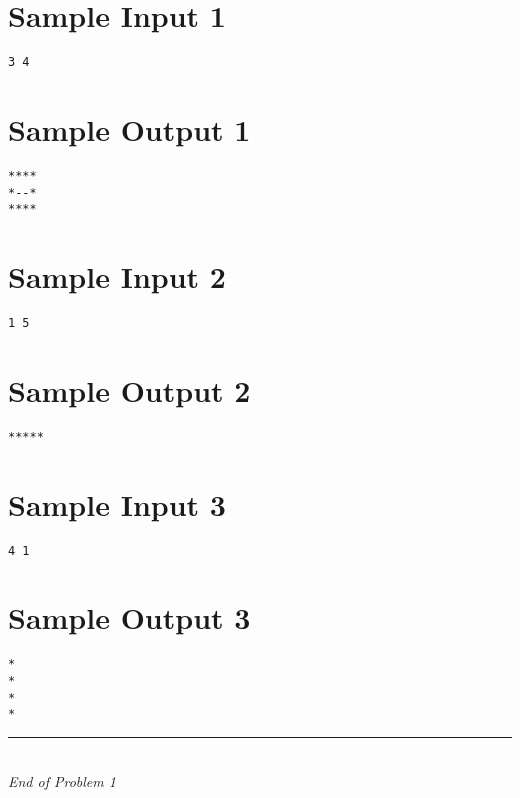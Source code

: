 \documentclass[12pt,a4paper]{article}
\begin{document}
\section*{Sample Input 1}
\begin{verbatim}
3 4
\end{verbatim}

\section*{Sample Output 1}
\begin{verbatim}
****
*--*
****
\end{verbatim}

\section*{Sample Input 2}
\begin{verbatim}
1 5
\end{verbatim}

\section*{Sample Output 2}
\begin{verbatim}
*****
\end{verbatim}

\section*{Sample Input 3}
\begin{verbatim}
4 1
\end{verbatim}

\section*{Sample Output 3}
\begin{verbatim}
*
*
*
*
\end{verbatim}

\vfill
\begin{center}
    \rule{0.8\textwidth}{0.4pt} \\[0.5em]
    \textit{End of Problem 1}
\end{center}
\end{document}
